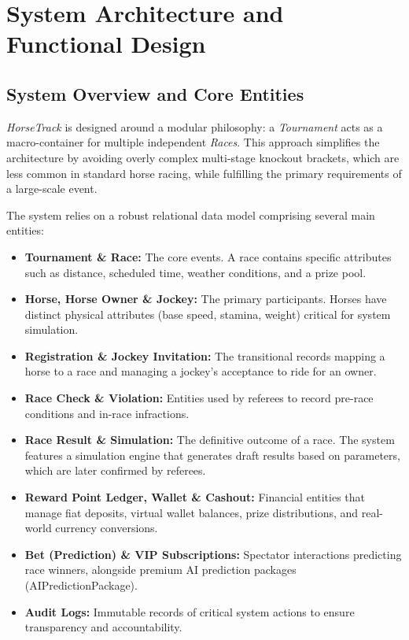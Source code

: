 \documentclass{llncs}
\begin{document}
\section{System Architecture and Functional Design}

\subsection{System Overview and Core Entities}
\textit{HorseTrack} is designed around a modular philosophy: a \textit{Tournament} acts as a macro-container for multiple independent \textit{Races}. This approach simplifies the architecture by avoiding overly complex multi-stage knockout brackets, which are less common in standard horse racing, while fulfilling the primary requirements of a large-scale event.

The system relies on a robust relational data model comprising several main entities:
\begin{itemize}
    \item \textbf{Tournament \& Race:} The core events. A race contains specific attributes such as distance, scheduled time, weather conditions, and a prize pool.
    \item \textbf{Horse, Horse Owner \& Jockey:} The primary participants. Horses have distinct physical attributes (base speed, stamina, weight) critical for system simulation.
    \item \textbf{Registration \& Jockey Invitation:} The transitional records mapping a horse to a race and managing a jockey's acceptance to ride for an owner.
    \item \textbf{Race Check \& Violation:} Entities used by referees to record pre-race conditions and in-race infractions.
    \item \textbf{Race Result \& Simulation:} The definitive outcome of a race. The system features a simulation engine that generates draft results based on parameters, which are later confirmed by referees.
    \item \textbf{Reward Point Ledger, Wallet \& Cashout:} Financial entities that manage fiat deposits, virtual wallet balances, prize distributions, and real-world currency conversions.
    \item \textbf{Bet (Prediction) \& VIP Subscriptions:} Spectator interactions predicting race winners, alongside premium AI prediction packages (AIPredictionPackage).
    \item \textbf{Audit Logs:} Immutable records of critical system actions to ensure transparency and accountability.
\end{itemize}
\end{document}

